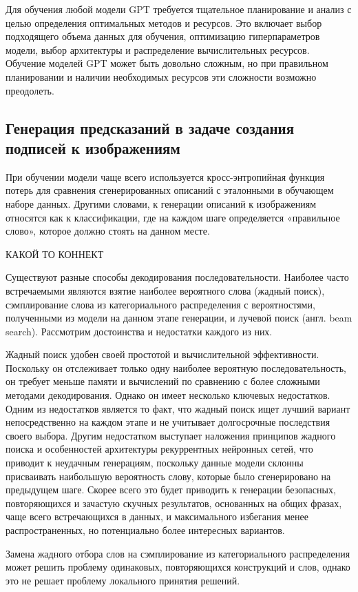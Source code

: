 \documentclass[a4paper,12pt]{extarticle}
\begin{document}
Для обучения любой модели GPT требуется тщательное планирование и анализ с целью определения оптимальных методов и ресурсов. Это включает выбор подходящего объема данных для обучения, оптимизацию гиперпараметров модели, выбор архитектуры и распределение вычислительных ресурсов. Обучение моделей GPT может быть довольно сложным, но при правильном планировании и наличии необходимых ресурсов эти сложности возможно преодолеть.

\subsection{Генерация предсказаний в задаче создания подписей к изображениям}

При обучении модели чаще всего используется кросс-энтропийная функция потерь для
сравнения сгенерированных описаний с эталонными в обучающем наборе данных. Другими словами, к генерации описаний к изображениям относятся как к классификации, где на каждом шаге определяется «правильное слово», которое должно стоять на данном месте.

КАКОЙ ТО КОННЕКТ

Существуют разные способы декодирования последовательности. Наиболее часто встречаемыми являются взятие наиболее вероятного слова (жадный поиск), сэмплирование слова из категориального распределения с вероятностями, полученными из модели на данном этапе генерации, и лучевой поиск (англ. beam search). Рассмотрим достоинства и недостатки каждого из них.

Жадный поиск удобен своей простотой и вычислительной эффективности. Поскольку он отслеживает только одну наиболее вероятную последовательность, он требует меньше памяти и вычислений по сравнению с более сложными методами декодирования. Однако он имеет несколько ключевых недостатков. Одним из недостатков является то факт, что жадный поиск ищет лучший вариант непосредственно на каждом этапе и не учитывает долгосрочные последствия своего выбора. Другим недостатком выступает наложения принципов жадного поиска и особенностей архитектуры рекуррентных нейронных сетей, что приводит к неудачным генерациям, поскольку данные модели склонны присваивать наибольшую вероятность слову, которые было сгенерировано на предыдущем шаге. Скорее всего это будет приводить к генерации безопасных, повторяющихся и зачастую скучных результатов, основанных на общих фразах, чаще всего встречающихся в данных, и максимального избегания менее распространенных, но потенциально более интересных вариантов.

Замена жадного отбора слов на сэмплирование из категориального распределения может решить проблему одинаковых, повторяющихся конструкций и слов, однако это не решает проблему локального принятия решений.
\end{document}
